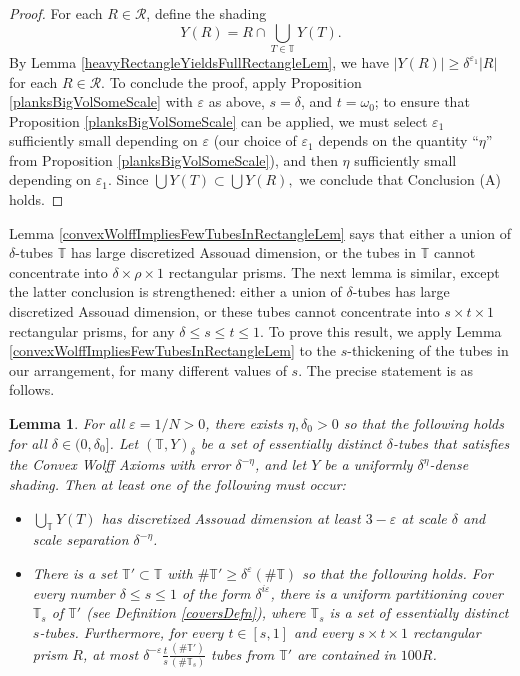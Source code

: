 \documentclass[letterpaper, reqno,11pt]{article}
\numberwithin{equation}{section}
\newcommand{\eps}{\varepsilon}
\newcommand{\tubes}{\mathbb{T}}
\numberwithin{thm}{section}
\newtheorem{lem}[thm]{Lemma}
\theoremstyle{remark}
\begin{document}
\begin{proof}
For each $R\in\mathcal{R}$, define the shading
\[
Y(R)=R\cap\bigcup_{T\in\tubes}Y(T).
\]
By Lemma \ref{heavyRectangleYieldsFullRectangleLem}, we have $|Y(R)|\geq\delta^{\eps_1}|R|$ for each $R\in\mathcal{R}$. To conclude the proof, apply Proposition \ref{planksBigVolSomeScale} with $\eps$ as above, $s=\delta$, and $t=\omega_0$; to ensure that Proposition \ref{planksBigVolSomeScale} can be applied, we must select $\eps_1$ sufficiently small depending on $\eps$ (our choice of $\eps_1$ depends on the quantity ``$\eta$'' from Proposition \ref{planksBigVolSomeScale}), and then $\eta$ sufficiently small depending on $\eps_1$. Since $\bigcup Y(T)\subset \bigcup Y(R),$ we conclude that Conclusion (A) holds. 
\end{proof}


Lemma \ref{convexWolffImpliesFewTubesInRectangleLem} says that either a union of $\delta$-tubes $\tubes$ has large discretized Assouad dimension, or the tubes in $\tubes$ cannot concentrate into $\delta\times\rho\times 1$ rectangular prisms. The next lemma is similar, except the latter conclusion is strengthened: either a union of $\delta$-tubes has large discretized Assouad dimension, or these tubes cannot concentrate into $s\times t\times 1$ rectangular prisms, for any $\delta\leq s\leq t\leq 1$. To prove this result, we apply Lemma \ref{convexWolffImpliesFewTubesInRectangleLem} to the $s$-thickening of the tubes in our arrangement, for many different values of $s$. The precise statement is as follows. 

\begin{lem}\label{correctNumberTubesInRectLem}
For all $\eps=1/N>0$, there exists $\eta,\delta_0>0$ so that the following holds for all $\delta\in(0,\delta_0]$. Let $(\tubes,Y)_\delta$ be a set of essentially distinct $\delta$-tubes that satisfies the Convex Wolff Axioms with error $\delta^{-\eta}$, and let $Y$ be a uniformly $\delta^{\eta}$-dense shading. Then at least one of the following must occur:
\begin{itemize}
	\item[(A)] $\bigcup_\tubes Y(T)$ has discretized Assouad dimension at least $3-\eps$ at scale $\delta$ and scale separation $\delta^{-\eta}$. 

	\item[(B)] There is a set $\tubes'\subset\tubes$ with $\#\tubes'\geq \delta^{\eps} (\#\tubes)$ so that the following holds. For every number $\delta\leq s\leq 1$ of the form $\delta^{i\eps}$, there is a uniform partitioning cover $\tubes_s$ of $\tubes'$ (see Definition \ref{coversDefn}), where $\tubes_s$ is a set of essentially distinct $s$-tubes. Furthermore, for every $t\in[s,1]$ and every $s\times t\times 1$ rectangular prism $R$, at most $\delta^{-\eps}\frac{t}{s}\frac{(\#\tubes')}{(\#\tubes_s)}$ tubes from $\tubes'$ are contained in $100R$. 
\end{itemize}
\end{lem}
\end{document}
